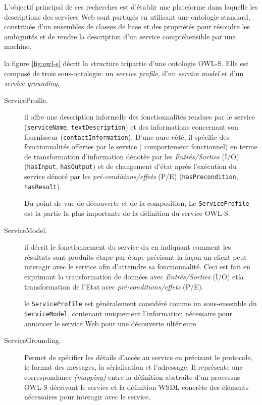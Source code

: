     L'objectif principal de ces recherches est d'établir une
    plateforme dans laquelle les descriptions des services Web sont
    partagés en utilisant une ontologie standard, constituée d'un
    ensembles de classes de base et des propriétés pour résoudre les
    ambiguïtés et de rendre la description d'un service compréhensible
    par une machine.

    la figure \ref{fig:owl-s} décrit la structure tripartie d'une
    ontologie \textsc{OWL-S}. Elle est composé de trois
    sous-ontologie: un \emph{service profile}, d'un \emph{service
      model} et d'un \emph{service grounding}.

    \SpecialItem
    \begin{description}
    \item[ServiceProfile.] il offre une description informelle des
      fonctionnalités rendues par le service (\verb|serviceName|,
      \verb|textDescription|) et des informations concernant son
      fournisseur (\verb|contactInformation|). D'une aure côté, il
      spécifie des fonctionnalités offertes par le service (
      comportement fonctionnel) en terme de transformation
      d'information dénotée par les \textit{Entrés/Sorties}
      \textsc{(I/O)} (\verb|hasInput|, \verb|hasOutput|) et de
      changement d'état après l'exécution du service dénoté par les
      \textit{pré-conditions/effets} \textsc{(P/E)}
      (\verb|hasPrecondition|, \verb|hasResult|).

      Du point de vue de découverte et de la composition, Le
      \verb|ServiceProfile| est la partie la plus importante de la
      définition du service \textsc{OWL-S}.

    \item[ServiceModel.] il décrit le fonctionnement du service du en
      indiquant comment les résultats sont produits étape par étape
      précisant la façon un client peut interagir avec le service afin
      d'atteindre sa fonctionnalité. Ceci est fait en exprimant la
      transformation de données avec \textit{Entrés/Sorties}
      \textsc{(I/O)} etla transformation de l'Etat avec
      \textit{pré-conditions/effets} \textsc{(P/E)}.

      le \verb|ServiceProfile| est généralement considéré comme un
      sous-ensemble du \verb|ServiceModel|, contenant uniquement
      l'information nécessaire pour annoncer le service Web pour une
      découverte ultérieure.

    \item[ServiceGrounding.] Permet de spécifier les détails d'accès
      au service en précisant le protocole, le format des messages, la
      sérialisation et l'adressage. Il représente une correspondance
      \textit{(mapping)} entre la définition abstraite d'un processus
      \textsc{OWL-S} décrivant le service et la définition
      \textsc{WSDL} concrète des éléments nécessaires pour interagir
      avec le service.


\end{description}
